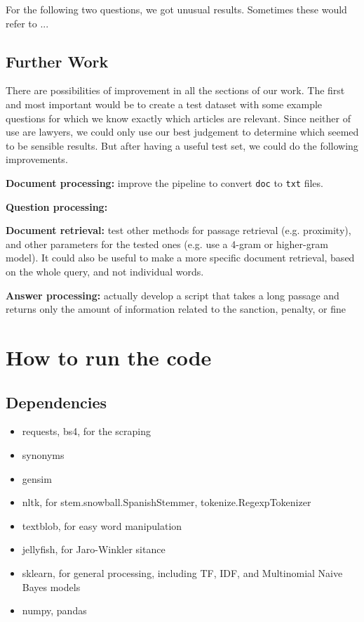 \documentclass[letterpaper, margin=1in]{article}
\begin{document}
For the following two questions, we got unusual results. Sometimes these would refer to ...
 
\subsection{Further Work}
There are possibilities of improvement in all the sections of our work. The first and most important would be to create a test dataset with some example questions for which we know exactly which articles are relevant. Since neither of use are lawyers, we could only use our best judgement to determine which seemed to be sensible results. But after having a useful test set, we could do the following improvements.
\begin{description}
\item \textbf{Document processing:} improve the pipeline to convert \texttt{doc} to \texttt{txt} files.
\item \textbf{Question processing:} 
\item \textbf{Document retrieval:} test other methods for passage retrieval (e.g. proximity), and other parameters for the tested ones (e.g. use a 4-gram or higher-gram model). It could also be useful to make a more specific document retrieval, based on the whole query, and not individual words.
\item \textbf{Answer processing:} actually develop a script that takes a long passage and returns only the amount of information related to the sanction, penalty, or fine
\end{description}

\newpage
\section{How to run the code}

\subsection{Dependencies}
\begin{itemize}
\item requests, bs4, for the scraping
\item synonyms
\item gensim 
\item nltk, for stem.snowball.SpanishStemmer, tokenize.RegexpTokenizer
\item textblob, for easy word manipulation
\item jellyfish, for Jaro-Winkler sitance
\item sklearn, for general processing, including TF, IDF, and Multinomial Naive Bayes models
\item numpy, pandas
\end{itemize}
\end{document}
